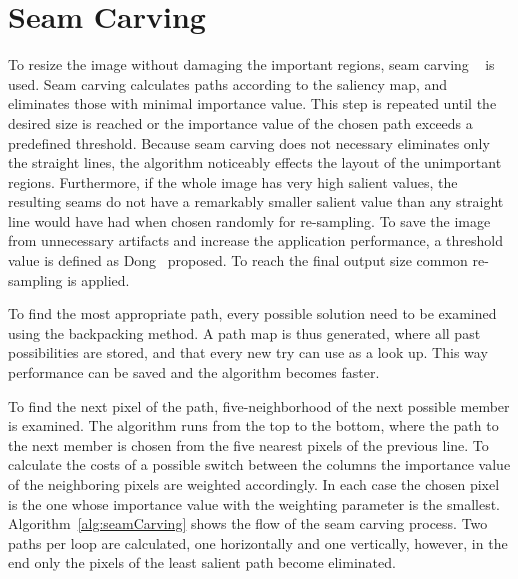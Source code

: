 \documentclass[draft,final]{vutinfth} %
\begin{document}
	\section{Seam Carving}
	To resize the image without damaging the important regions, seam carving ~\cite{avidan2007seam} is used.
	Seam carving calculates paths according to the saliency map, and eliminates those with minimal importance value.
	This step is repeated until the desired size is reached or the importance value of the chosen path exceeds a predefined threshold.
	Because seam carving does not necessary eliminates only the straight lines, the algorithm noticeably effects the layout of the unimportant regions.
	Furthermore, if the whole image has very high salient values, the resulting seams do not have a remarkably smaller salient value than any straight line would have had when chosen randomly for re-sampling.
	To save the image from unnecessary artifacts and increase the application performance, a threshold value is defined as Dong~\cite{dong2009optimized} proposed.
	To reach the final output size common re-sampling is applied.\par 
	To find the most appropriate path, every possible solution need to be examined using the backpacking method.
	A path map is thus generated, where all past possibilities are stored, and that every new try can use as a look up.
	This way performance can be saved and the algorithm becomes faster.\par 
	To find the next pixel of the path, five-neighborhood of the next possible member is examined.
	The algorithm runs from the top to the bottom, where the path to the next member is chosen from the five nearest pixels of the previous line.
	To calculate the costs of a possible switch between the columns the importance value of the neighboring pixels are weighted accordingly.
	In each case the chosen pixel is the one whose importance value with the weighting parameter is the smallest.
	Algorithm~\ref{alg:seamCarving} shows the flow of the seam carving process.
	Two paths per loop are calculated, one horizontally and one vertically, however, in the end only the pixels of the least salient path become eliminated.\par 
\end{document}
